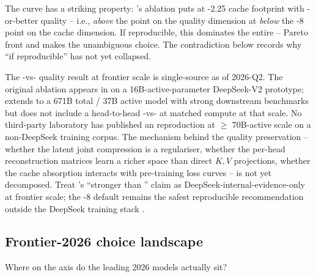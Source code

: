 The curve has a striking property: \citet{deepseek-v2}'s ablation
puts  at -2.25 cache footprint with -or-better quality --
i.e., \emph{above} the  point on the quality dimension at
\emph{below} the -8 point on the cache dimension. If
reproducible, this dominates the entire -- Pareto front and
makes  the unambiguous choice. The contradiction below records
why ``if reproducible'' has not yet collapsed.

\begin{contradiction}
The -vs- quality result at frontier scale is single-source as
of 2026-Q2. The original ablation appears in
\citet[\S 2.1.4]{deepseek-v2} on a 16B-active-parameter
DeepSeek-V2 prototype; \citet{deepseek-v3} extends  to a 671B
total / 37B active model with strong downstream benchmarks but does
not include a head-to-head -vs- at matched compute at that
scale. No third-party laboratory has published an  reproduction
at $\geq$ 70B-active scale on a non-DeepSeek training corpus. The
mechanism behind the quality preservation -- whether the latent
joint compression is a regulariser, whether the per-head
reconstruction matrices learn a richer space than direct $K, V$
projections, whether the cache absorption interacts with
pre-training loss curves -- is not yet decomposed. Treat 's
``stronger than '' claim as DeepSeek-internal-evidence-only at
frontier scale; the -8 default remains the safest reproducible
recommendation outside the DeepSeek training stack
\citep[cf.][\S 3.1]{ainslie2023}.
\end{contradiction}

\subsection{Frontier-2026 choice landscape}
\label{sec:attn-frontier}

Where on the axis do the leading 2026 models actually sit?

